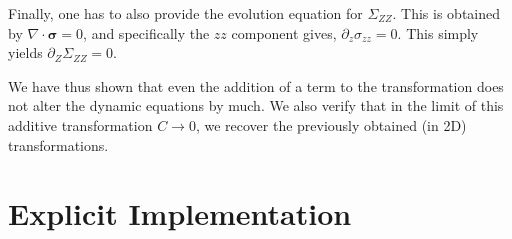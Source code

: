 \documentclass[12pt,a4paper]{article}
\begin{document}

Finally, one has to also provide the evolution equation for $\Sigma_{ZZ}$. This is obtained by $\nabla\cdot\bm{\sigma}=0$, and specifically the $zz$ component gives, $\partial_z \sigma_{zz} = 0$. This simply yields $\partial_Z \Sigma_{ZZ}=0$.

We have thus shown that even the addition of a term to the transformation does not alter the dynamic equations by much. We also verify that in the limit of this additive transformation $C\rightarrow0$, we recover the previously obtained (in 2D) transformations.

\section{Explicit Implementation}
\end{document}
